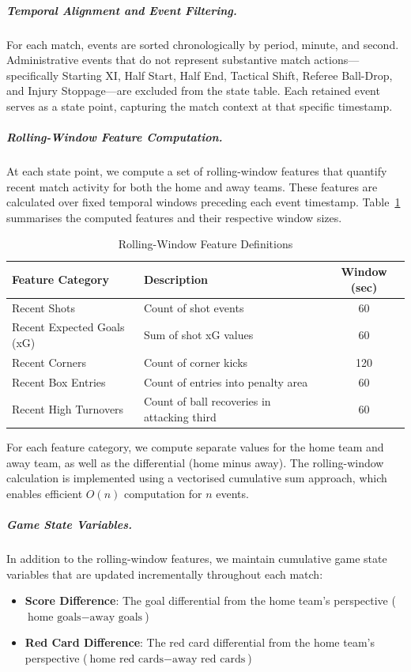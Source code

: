 \documentclass[pdflatex,sn-mathphys-num]{sn-jnl}
\theoremstyle{thmstyleone}
\theoremstyle{thmstyletwo}
\theoremstyle{thmstylethree}
\begin{document}
\subparagraph{Temporal Alignment and Event Filtering.}
For each match, events are sorted chronologically by period, minute, and second. Administrative events that do not represent substantive match actions---specifically Starting XI, Half Start, Half End, Tactical Shift, Referee Ball-Drop, and Injury Stoppage---are excluded from the state table. Each retained event serves as a state point, capturing the match context at that specific timestamp.

\subparagraph{Rolling-Window Feature Computation.}
At each state point, we compute a set of rolling-window features that quantify recent match activity for both the home and away teams. These features are calculated over fixed temporal windows preceding each event timestamp. Table~\ref{tab:rolling_features} summarises the computed features and their respective window sizes.

\begin{table}[htbp]
\centering
\caption{Rolling-Window Feature Definitions}
\label{tab:rolling_features}
\begin{tabular}{llc}
\toprule
\textbf{Feature Category} & \textbf{Description} & \textbf{Window (sec)} \\
\midrule
Recent Shots & Count of shot events & 60 \\
Recent Expected Goals (xG) & Sum of shot xG values & 60 \\
Recent Corners & Count of corner kicks & 120 \\
Recent Box Entries & Count of entries into penalty area & 60 \\
Recent High Turnovers & Count of ball recoveries in attacking third & 60 \\
\bottomrule
\end{tabular}
\end{table}

For each feature category, we compute separate values for the home team and away team, as well as the differential (home minus away). The rolling-window calculation is implemented using a vectorised cumulative sum approach, which enables efficient $O(n)$ computation for $n$ events.

\subparagraph{Game State Variables.}
In addition to the rolling-window features, we maintain cumulative game state variables that are updated incrementally throughout each match:
\begin{itemize}
    \item \textbf{Score Difference}: The goal differential from the home team's perspective ($\text{home goals} - \text{away goals}$)
    \item \textbf{Red Card Difference}: The red card differential from the home team's perspective ($\text{home red cards} - \text{away red cards}$)
\end{itemize}
\end{document}
